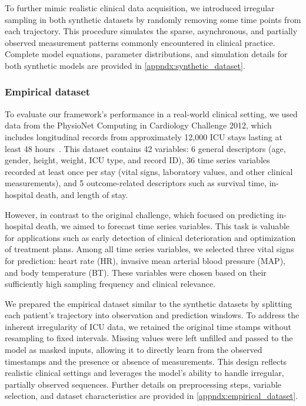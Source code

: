 \documentclass[preprint,12pt]{elsarticle}
\begin{document}
To further mimic realistic clinical data acquisition, we introduced irregular sampling in both synthetic datasets by randomly removing some time points from each trajectory. This procedure simulates the sparse, asynchronous, and partially observed measurement patterns commonly encountered in clinical practice. Complete model equations, parameter distributions, and simulation details for both synthetic models are provided in \ref{appndx:synthetic_dataset}.


\subsubsection{Empirical dataset}
To evaluate our framework's performance in a real-world clinical setting, we used data from the PhysioNet Computing in Cardiology Challenge 2012, which includes longitudinal records from approximately 12,000 ICU stays lasting at least 48 hours~\citep{churpek2016value}. This dataset contains 42 variables: 6 general descriptors (age, gender, height, weight, ICU type, and record ID), 36 time series variables recorded at least once per stay (vital signs, laboratory values, and other clinical measurements), and 5 outcome-related descriptors such as survival time, in-hospital death, and length of stay.

However, in contrast to the original challenge, which focused on predicting in-hospital death, we aimed to forecast time series variables. This task is valuable for applications such as early detection of clinical deterioration and optimization of treatment plans. Among all time series variables,  we selected three vital signs for prediction: heart rate (HR), invasive mean arterial blood pressure (MAP), and body temperature (BT). These variables were chosen based on their sufficiently high sampling frequency and clinical relevance.

We prepared the empirical dataset similar to the synthetic datasets by splitting each patient's trajectory into observation and prediction windows. To address the inherent irregularity of ICU data, we retained the original time stamps without resampling to fixed intervals. Missing values were left unfilled and passed to the model as masked inputs, allowing it to directly learn from the observed timestamps and the presence or absence of measurements. This design reflects realistic clinical settings and leverages the model’s ability to handle irregular, partially observed sequences. Further details on preprocessing steps, variable selection, and dataset characteristics are provided in \ref{appndx:empirical_dataset}.
\end{document}
